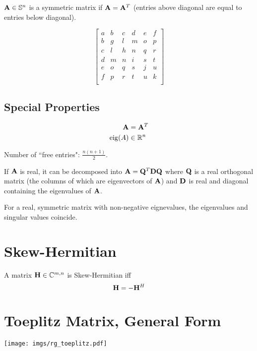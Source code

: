 $\mathbf{A}\in\mathbb{S}^{n}$ is a symmetric matrix if $\mathbf{A}=\mathbf{A}^T$ (entries above diagonal are equal to entries below diagonal).

\begin{equation}
\begin{bmatrix}
a & b & c & d & e & f \\
b & g & l & m & o & p \\
c & l & h & n & q & r \\
d & m & n & i & s & t \\
e & o & q & s & j & u \\
f & p & r & t & u & k \\
\end{bmatrix}
\end{equation}


\subsection*{Special Properties}

\begin{align}
\mathbf{A}    &=\mathbf{A}^T \\
\operatorname{eig}(A)&\in\mathbb{R}^{n}
\end{align}

Number of ``free entries": $\frac{n(n+1)}{2}$.

If $\mathbf{A}$ is real, it can be decomposed into $\mathbf{A}=\mathbf{Q}^T\mathbf{D}\mathbf{Q}$ where $\mathbf{Q}$ is a real orthogonal matrix (the columns of which are eigenvectors of $\mathbf{A}$) and $\mathbf{D}$ is real and diagonal containing the eigenvalues of $\mathbf{A}$.

For a real, symmetric matrix with non-negative eignevalues, the eigenvalues and singular values coincide.



\section{Skew-Hermitian}
A matrix $\mathbf{H}\in\mathbb{C}^{m,n}$ is Skew-Hermitian iff
\begin{equation}
\mathbf{H}=-\mathbf{H}^H
\end{equation}



\section{Toeplitz Matrix, General Form}

\begin{center}
\texttt{[image: imgs/rg\_toeplitz.pdf]}
\end{center}


